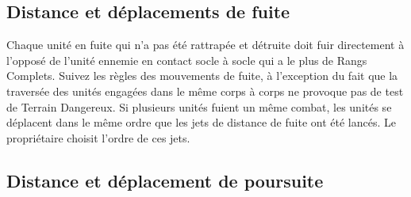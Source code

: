 \subsection{Distance et déplacements de fuite}

Chaque unité en fuite qui n'a pas été rattrapée et détruite doit fuir directement à l'opposé de l'unité ennemie en contact socle à socle qui a le plus de Rangs Complets.  Suivez les règles des mouvements de fuite, à l'exception du fait que la traversée des unités engagées dans le même corps à corps ne provoque pas de test de Terrain Dangereux. Si plusieurs unités fuient un même combat, les unités se déplacent dans le même ordre que les jets de distance de fuite ont été lancés. Le propriétaire choisit l'ordre de ces jets.

\subsection{Distance et déplacement de poursuite}

